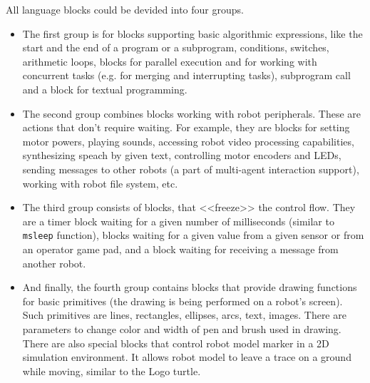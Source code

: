 \documentclass[conference]{IEEEtran}
\begin{document}
All language blocks could be devided into four groups.

\begin{itemize}
    \item The first group is for blocks supporting basic algorithmic expressions, like the start and the end of a program or a subprogram, conditions, switches, arithmetic loops, blocks for parallel execution and for working with concurrent tasks (e.g. for merging and interrupting tasks), subprogram call and a block for textual programming.
    \item The second group combines blocks working with robot peripherals. These are actions that don't require waiting. For example, they are blocks for setting motor powers, playing sounds, accessing robot video processing capabilities, synthesizing speach by given text, controlling motor encoders and LEDs, sending messages to other robots (a part of multi-agent interaction support), working with robot file system, etc.
    \item The third group consists of blocks, that <<freeze>> the control flow. They are a timer block waiting for a given number of milliseconds (similar to \texttt{msleep} function), blocks waiting for a given value from a given sensor or from an operator game pad, and a block waiting for receiving a message from another robot. 
    \item And finally, the fourth group contains blocks that provide drawing functions for basic primitives (the drawing is being performed on a robot's screen). Such primitives are lines, rectangles, ellipses, arcs, text, images. There are parameters to change color and width of pen and brush used in drawing. There are also special blocks that control robot model marker in a 2D simulation environment. It allows robot model to leave a trace on a ground while moving, similar to the Logo turtle.
\end{itemize}
\end{document}
